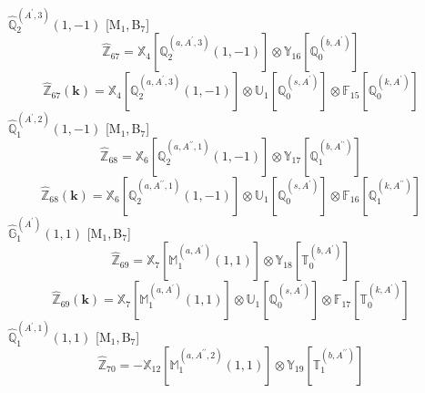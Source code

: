 \documentclass[fleqn,10pt,landscape]{article}
\begin{document}
\begin{itemize}
\begin{dmath*}
\end{dmath*}
\vspace{4mm}
\noindent {} $\,\,\,\hat{\mathbb{Q}}_{2}^{(A^{\prime},3)}(1,-1)$ [M$_{1}$,\,B$_{7}$]
\begin{dmath*}
\hat{\mathbb{Z}}_{67}=\mathbb{X}_{4}[\mathbb{Q}_{2}^{(a,A^{\prime},3)}(1,-1)] \otimes\mathbb{Y}_{16}[\mathbb{Q}_{0}^{(b,A^{\prime})}]
\end{dmath*}
\begin{dmath*}
\hat{\mathbb{Z}}_{67}(\bm{k})=\mathbb{X}_{4}[\mathbb{Q}_{2}^{(a,A^{\prime},3)}(1,-1)] \otimes\mathbb{U}_{1}[\mathbb{Q}_{0}^{(s,A^{\prime})}] \otimes\mathbb{F}_{15}[\mathbb{Q}_{0}^{(k,A^{\prime})}]
\end{dmath*}
\vspace{4mm}
\noindent {} $\,\,\,\hat{\mathbb{Q}}_{1}^{(A^{\prime},2)}(1,-1)$ [M$_{1}$,\,B$_{7}$]
\begin{dmath*}
\hat{\mathbb{Z}}_{68}=\mathbb{X}_{6}[\mathbb{Q}_{2}^{(a,A^{\prime\prime},1)}(1,-1)] \otimes\mathbb{Y}_{17}[\mathbb{Q}_{1}^{(b,A^{\prime\prime})}]
\end{dmath*}
\begin{dmath*}
\hat{\mathbb{Z}}_{68}(\bm{k})=\mathbb{X}_{6}[\mathbb{Q}_{2}^{(a,A^{\prime\prime},1)}(1,-1)] \otimes\mathbb{U}_{1}[\mathbb{Q}_{0}^{(s,A^{\prime})}] \otimes\mathbb{F}_{16}[\mathbb{Q}_{1}^{(k,A^{\prime\prime})}]
\end{dmath*}
\vspace{4mm}
\noindent {} $\,\,\,\hat{\mathbb{G}}_{1}^{(A^{\prime})}(1,1)$ [M$_{1}$,\,B$_{7}$]
\begin{dmath*}
\hat{\mathbb{Z}}_{69}=\mathbb{X}_{7}[\mathbb{M}_{1}^{(a,A^{\prime})}(1,1)] \otimes\mathbb{Y}_{18}[\mathbb{T}_{0}^{(b,A^{\prime})}]
\end{dmath*}
\begin{dmath*}
\hat{\mathbb{Z}}_{69}(\bm{k})=\mathbb{X}_{7}[\mathbb{M}_{1}^{(a,A^{\prime})}(1,1)] \otimes\mathbb{U}_{1}[\mathbb{Q}_{0}^{(s,A^{\prime})}] \otimes\mathbb{F}_{17}[\mathbb{T}_{0}^{(k,A^{\prime})}]
\end{dmath*}
\vspace{4mm}
\noindent {} $\,\,\,\hat{\mathbb{Q}}_{1}^{(A^{\prime},1)}(1,1)$ [M$_{1}$,\,B$_{7}$]
\begin{dmath*}
\hat{\mathbb{Z}}_{70}=- \mathbb{X}_{12}[\mathbb{M}_{1}^{(a,A^{\prime\prime},2)}(1,1)] \otimes\mathbb{Y}_{19}[\mathbb{T}_{1}^{(b,A^{\prime\prime})}]
\end{dmath*}
\begin{dmath*}

\end{dmath*}
\end{itemize}
\end{document}
